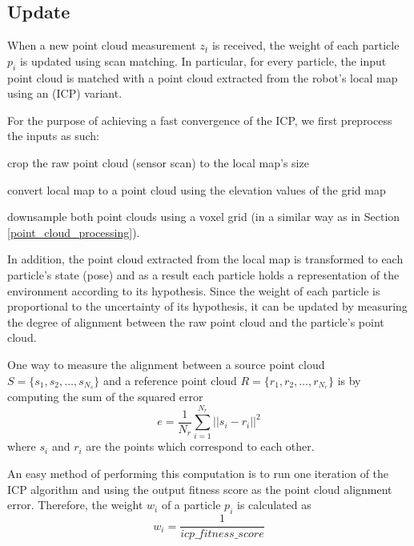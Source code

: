 \subsection{Update} \label{pf_update}

When a new point cloud measurement $z_t$ is received, the weight of each
particle $p_i$ is updated using scan matching.
In particular, for every particle, the input point cloud is matched with
a point cloud extracted from the robot's local map using
an  (ICP) variant.

For the purpose of achieving a fast convergence of the ICP,
we first preprocess the inputs as such:
\begin{enumerate*}[label=(\roman*)]
    \item crop the raw point cloud (sensor scan) to the local map's size
    \item convert local map to a point cloud using the elevation values of
        the grid map
    \item downsample both point clouds using a voxel grid (in a similar way
        as in Section \ref{point_cloud_processing}).
\end{enumerate*}

In addition, the point cloud extracted from the local map is transformed to
each particle's state (pose) and as a result each particle holds a
representation of the environment according to its hypothesis.
Since the weight of each particle is proportional to the uncertainty
of its hypothesis, it can be updated by measuring the degree of
alignment between the raw point cloud and the particle's point cloud.

One way to measure the alignment between a source point cloud
$S = \{s_1, s_2, \dots, s_{N_s}\}$ and a reference point cloud
$R = \{r_1, r_2, \dots, r_{N_r}\}$ is by computing the sum of the
squared error
\begin{equation}
    e = \frac{1}{N_r} \sum_{i=1}^{N_r} || s_i - r_i ||^2
\end{equation}
where $s_i$ and $r_i$ are the points which correspond to each other.

An easy method of performing this computation is to run one iteration of
the ICP algorithm and using the output fitness score as the point cloud
alignment error.
Therefore, the weight $w_i$ of a particle $p_i$ is calculated as
\begin{equation}
    w_i = \frac{1}{icp\_fitness\_score}
\end{equation}

